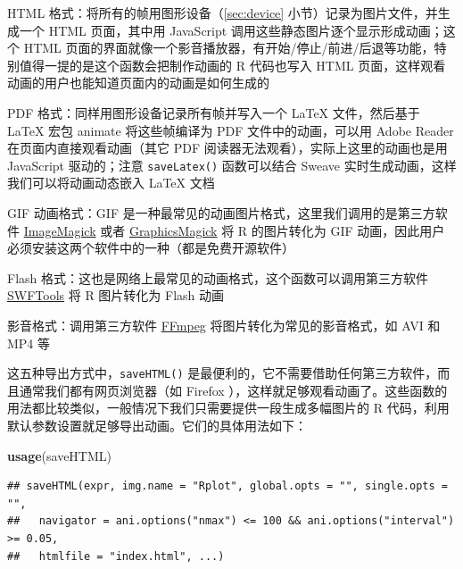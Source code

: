 \documentclass[
  b5paper,
  UTF8,twoside]{book}
\newenvironment{Shaded}{\begin{snugshade}}{\end{snugshade}}
\newcommand{\FunctionTok}[1]{\textcolor[rgb]{0.13,0.29,0.53}{\textbf{#1}}}
\newcommand{\NormalTok}[1]{#1}
\providecommand{\tightlist}{%
  \setlength{\itemsep}{0pt}\setlength{\parskip}{0pt}}
\begin{document}
\begin{description}
\tightlist
\item[\texttt{saveHTML()}]
HTML 格式：将所有的帧用图形设备（\ref{sec:device} 小节）记录为图片文件，并生成一个 HTML 页面，其中用 JavaScript 调用这些静态图片逐个显示形成动画；这个 HTML 页面的界面就像一个影音播放器，有开始/停止/前进/后退等功能，特别值得一提的是这个函数会把制作动画的 R 代码也写入 HTML 页面，这样观看动画的用户也能知道页面内的动画是如何生成的
\item[\texttt{saveLatex()}]
PDF 格式：同样用图形设备记录所有帧并写入一个 LaTeX 文件，然后基于 LaTeX 宏包 animate 将这些帧编译为 PDF 文件中的动画，可以用 Adobe Reader 在页面内直接观看动画（其它 PDF 阅读器无法观看），实际上这里的动画也是用 JavaScript 驱动的；注意 \texttt{saveLatex()} 函数可以结合 Sweave 实时生成动画，这样我们可以将动画动态嵌入 LaTeX 文档
\item[\texttt{saveGIF()}]
GIF 动画格式：GIF 是一种最常见的动画图片格式，这里我们调用的是第三方软件 \href{https://imagemagick.org/}{ImageMagick} 或者 \href{http://www.graphicsmagick.org}{GraphicsMagick} 将 R 的图片转化为 GIF 动画，因此用户必须安装这两个软件中的一种（都是免费开源软件）
\item[\texttt{saveSWF()}]
Flash 格式：这也是网络上最常见的动画格式，这个函数可以调用第三方软件 \href{http://swftools.org}{SWFTools} 将 R 图片转化为 Flash 动画
\item[\texttt{saveVideo()}]
影音格式：调用第三方软件 \href{https://ffmpeg.org/}{FFmpeg} 将图片转化为常见的影音格式，如 AVI 和 MP4 等
\end{description}

这五种导出方式中，\texttt{saveHTML()} 是最便利的，它不需要借助任何第三方软件，而且通常我们都有网页浏览器（如 Firefox ），这样就足够观看动画了。这些函数的用法都比较类似，一般情况下我们只需要提供一段生成多幅图片的 R 代码，利用默认参数设置就足够导出动画。它们的具体用法如下：

\begin{Shaded}
\begin{Highlighting}[]
\FunctionTok{usage}\NormalTok{(saveHTML)}
\end{Highlighting}
\end{Shaded}

\begin{verbatim}
## saveHTML(expr, img.name = "Rplot", global.opts = "", single.opts = "",
##   navigator = ani.options("nmax") <= 100 && ani.options("interval") >= 0.05,
##   htmlfile = "index.html", ...)
\end{verbatim}
\end{document}
